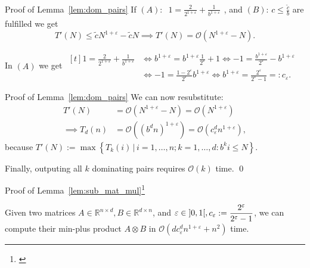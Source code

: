 \begin{frame}{Proof of Lemma~\ref{lem:dom_pairs}}
    If $(A)$: $\begin{aligned}1 = \frac{2}{2^{1 + \varepsilon}} + \frac{1}{b^{1 + \varepsilon}}\end{aligned}$, and $(B)$: $c \leq \frac{\tilde{c}}{b}$ are fulfilled we get
    \[
        T'(N) \leq \tilde{c} N^{1 + \varepsilon} - \tilde{c} N \implies T'(N) = \mathcal{O}\left( N^{1 + \varepsilon} - N \right).
    \]

    In $(A)$ we get $\begin{aligned}[t]
        1 = \frac{2}{2^{1 + \varepsilon}} + \frac{1}{b^{1 + \varepsilon}} &\iff b^{1 + \varepsilon} = b^{1 + \varepsilon} \frac{1}{2^\varepsilon} + 1 \iff -1 = \frac{b^{1 + \varepsilon}}{2^\varepsilon} - b^{1 + \varepsilon} \\
        &\iff -1 = \frac{1 - 2^\varepsilon}{2^\varepsilon} b^{1 + \varepsilon} \iff b^{1 + \varepsilon} = \frac{2^\varepsilon}{2^\varepsilon - 1} =: c_\varepsilon.
    \end{aligned}$
\end{frame}

\begin{frame}{Proof of Lemma~\ref{lem:dom_pairs}}
    We can now resubstitute:    
    \begin{align*}
        T'(N) &= \mathcal{O}\left( N^{1 + \varepsilon} - N \right) = \mathcal{O}\left( N^{1 + \varepsilon} \right) \\
        \implies T_d(n) &= \mathcal{O}\left( {\left( b^d n \right)}^{1 + \varepsilon} \right) = \mathcal{O}\left( c_\varepsilon^d n^{1 + \varepsilon} \right),
    \end{align*}
    because $T'(N) := \max \left\{ T_k(i) \,|\, i = 1, \dots, n; k = 1, \dots, d: b^k i \leq N \right\}$. 
    
    Finally, outputing all $k$ dominating pairs requires $\mathcal{O}\left( k \right)$ time. \qed{}
\end{frame}

\begin{frame}{Proof of Lemma~\ref{lem:sub_mat_mul}\footnote[1]{\cite[Lemma~3.1]{Chan2007}}}
    \setcounter{theorem}{1}
    \begin{lemma}
        Given two matrices $A \in \mathbb{R}^{n \times d}, B \in \mathbb{R}^{d \times n}$, and $\varepsilon \in \interval[open]{0}{1}, \begin{aligned}c_\varepsilon := \frac{2^\varepsilon}{2^\varepsilon - 1}\end{aligned}$, we can compute their min-plus product $A \otimes B$ in $\mathcal{O}\left( d c_\varepsilon^d n^{1 + \varepsilon} + n^2 \right)$ time.
    \end{lemma}
\end{frame}

